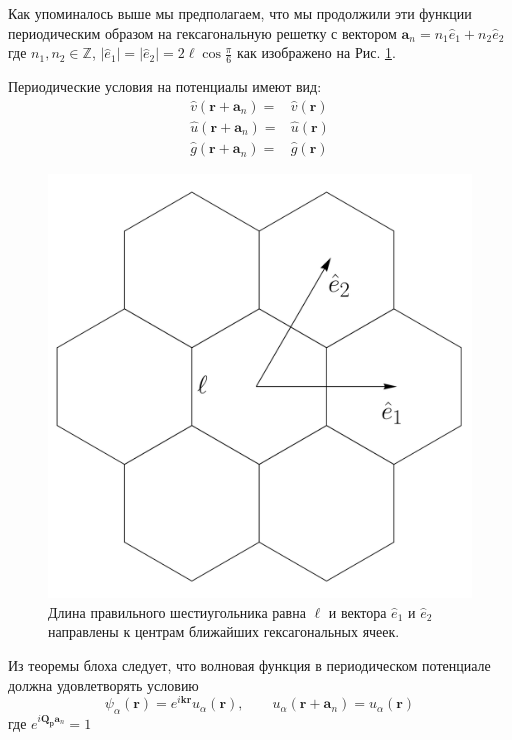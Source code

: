 \documentclass[a4paper,article,14pt]{extarticle}
\begin{document}
Как упоминалось выше мы предполагаем, что мы продолжили эти функции периодическим образом на гексагональную решетку с вектором $\mathbf{a}_n =   n_1 \hat {e}_1 + n_2 \hat {e}_2  $  где $n_1,n_2 \in \mathbb{Z}$, $|\hat {e}_1 |=|\hat {e}_2 |= 2 \ell \cos{\frac{\pi}{6}}$ как изображено на Рис. \ref{pic:hexagon_geometry}.

Периодические условия на потенциалы имеют вид:
\begin{equation}
\label{eq:periodic_potentials}
\begin{aligned}
\hat v(\mathbf{r} + \mathbf{a}_n) =& \hat v(\mathbf{r}) \\
\hat u(\mathbf{r} + \mathbf{a}_n) =&  \hat u(\mathbf{r}) \\
\hat g(\mathbf{r} + \mathbf{a}_n) =&  \hat g(\mathbf{r})
\end{aligned}
\end{equation}

\begin{figure}[t]
\centering	
\includegraphics[width=0.8\columnwidth]{images/geometry_lattice.pdf}
\caption{Длина правильного шестиугольника равна $\ell$ и вектора $\hat {e}_1$ и $\hat {e}_2$ направлены к центрам ближайших гексагональных ячеек. }
\label{pic:hexagon_geometry}
\end{figure}

\noindent Из теоремы блоха\cite{landau} следует, что волновая функция в периодическом потенциале должна  удовлетворять условию
\begin{equation}
\label{eq:bloch_wave}
\psi_\alpha (\mathbf{r}) =  e^{i \mathbf{k} \mathbf{r}} u_ \alpha (\mathbf{r} ), \qquad u_ \alpha (\mathbf{r} + \mathbf{a}_n) = u_ \alpha (\mathbf{r})
\end{equation}
где $e^{i \mathbf{Q_p} \mathbf{a}_n }=1$
\end{document}
